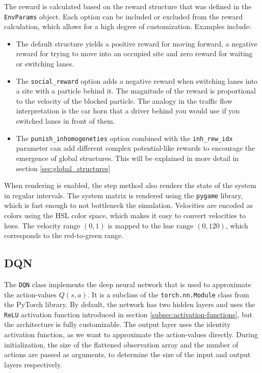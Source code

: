 The reward is calculated based on the reward structure that was defined in the \texttt{EnvParams} object. Each option can be included or excluded from the reward calculation, which allows for a high degree of customization. Examples include:
\begin{itemize}
    \item The default structure yields a positive reward for moving forward, a negative reward for trying to move into an occupied site and zero reward for waiting or switching lanes. 
    \item The \texttt{social\_reward} option adds a negative reward when switching lanes into a site with a particle behind it. The magnitude of the reward is proportional to the velocity of the blocked particle. The analogy in the traffic flow interpretation is the car horn that a driver behind you would use if you switched lanes in front of them.
    \item The \texttt{punish\_inhomogeneties} option combined with the \texttt{inh\_rew\_idx} parameter can add different complex potential-like rewards to encourage the emergence of global structures. This will be explained in more detail in section \ref{sec:global_structures}
\end{itemize}
When rendering is enabled, the step method also renders the state of the system in regular intervals. The system matrix is rendered using the \texttt{pygame} library, which is fast enough to not bottleneck the simulation. Velocities are encoded as colors using the HSL color space, which makes it easy to convert velocities to hues. The velocity range $(0,1)$ is mapped to the hue range $(0,120)$, which corresponds to the red-to-green range. 



\subsection{DQN}
\label{subsec:implementation-dqn}
The \texttt{DQN} class implements the deep neural network that is used to approximate the action-values $Q(s,a)$. It is a subclass of the \texttt{torch.nn.Module} class from the PyTorch library. By default, the network has two hidden layers and uses the \texttt{ReLU} activation function introduced in section \ref{subsec:activation-functions}, but the architecture is fully customizable. The output layer uses the identity activation function, as we want to approximate the action-values directly. During initialization, the size of the flattened observation array and the number of actions are passed as arguments, to determine the size of the input and output layers respectively. 


